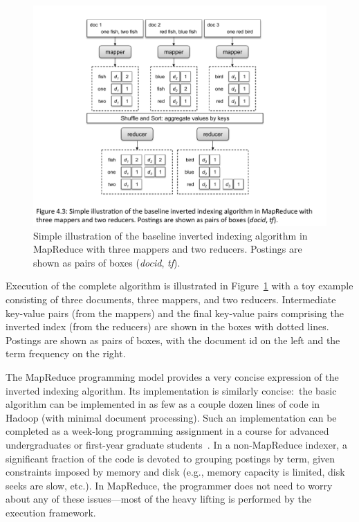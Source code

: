 \begin{figure}[t]
\begin{center}
\includegraphics[scale=0.6]{figures/fig-ch4-indexing-MR-baseline.pdf}
\end{center}
\caption{Simple illustration of the baseline inverted indexing
  algorithm in MapReduce with three mappers and two reducers.
  Postings are shown as pairs of boxes (\emph{docid}, \emph{tf}).}
\label{chapter-indexing:MR-baseline}
\end{figure}

Execution of the complete algorithm is illustrated in
Figure~\ref{chapter-indexing:MR-baseline} with a toy example
consisting of three documents, three mappers, and two reducers.
Intermediate key-value pairs (from the mappers) and the final
key-value pairs comprising the inverted index (from the reducers) are
shown in the boxes with dotted lines.  Postings are shown as pairs of
boxes, with the document id on the left and the term frequency on the
right.

The MapReduce programming model provides a very concise expression of
the inverted indexing algorithm.  Its implementation is similarly
concise:\ the basic algorithm can be implemented in as few as a couple
dozen lines of code in Hadoop (with minimal document processing).
Such an implementation can be completed as a week-long programming
assignment in a course for advanced undergraduates or first-year
graduate students~\cite{KimballA_etal_2008,Lin_TeachCL2008}.  In a
non-MapReduce indexer, a significant fraction of the code is devoted
to grouping postings by term, given constraints imposed by memory and
disk (e.g., memory capacity is limited, disk seeks are slow, etc.).
In MapReduce, the programmer does not need to worry about any of these
issues---most of the heavy lifting is performed by the execution
framework.

